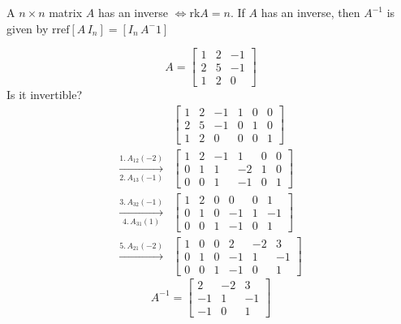 \documentclass[../main.tex]{subfiles}
\begin{document}
\begin{theorem}[]
    A \( n \times n \) matrix \( A \) has an inverse \( \iff \text{rk}A = n \).
    If \( A \) has an inverse, then \( A^{-1} \) is given by \( \text{rref}\left[ A \, I_n \right] = \left[ I_n \, A^-1 \right] \)
\end{theorem}

\begin{example}[]
    \[ A = \begin{bmatrix}
        1 & 2 & -1 \\
        2 & 5 & -1 \\
        1 & 2 & 0
    \end{bmatrix} \]
    Is it invertible?
    \begin{align*}
        &\begin{bmatrix}
            1 & 2 & -1 & 1 & 0 & 0 \\
            2 & 5 & -1 & 0 & 1 & 0 \\
            1 & 2 & 0 & 0 & 0 & 1
        \end{bmatrix} \\[2mm]
        \xrightarrow[2. \, A_{13}(-1)]{1. \, A_{12}(-2)}
        &\begin{bmatrix}
            1 & 2 & -1 & 1 & 0 & 0 \\
            0 & 1 & 1 & -2 & 1 & 0 \\
            0 & 0 & 1 & -1 & 0 & 1
        \end{bmatrix} \\[2mm]
        \xrightarrow[4. \, A_{31}(1)]{3. \, A_{32}(-1)}
        &\begin{bmatrix}
            1 & 2 & 0 & 0 & 0 & 1 \\
            0 & 1 & 0 & -1 & 1 & -1 \\
            0 & 0 & 1 & -1 & 0 & 1
        \end{bmatrix} \\[2mm]
        \xrightarrow{5. \, A_{21}(-2)}
        &\begin{bmatrix}
            1 & 0 & 0 & 2 & -2 & 3 \\
            0 & 1 & 0 & -1 & 1 & -1 \\
            0 & 0 & 1 & -1 & 0 & 1
        \end{bmatrix}
    \end{align*}
    \[ A^{-1} = \begin{bmatrix}
        2 & -2 & 3 \\
        -1 & 1 & -1 \\
        -1 & 0 & 1
    \end{bmatrix} \]


\end{example}
\end{document}
